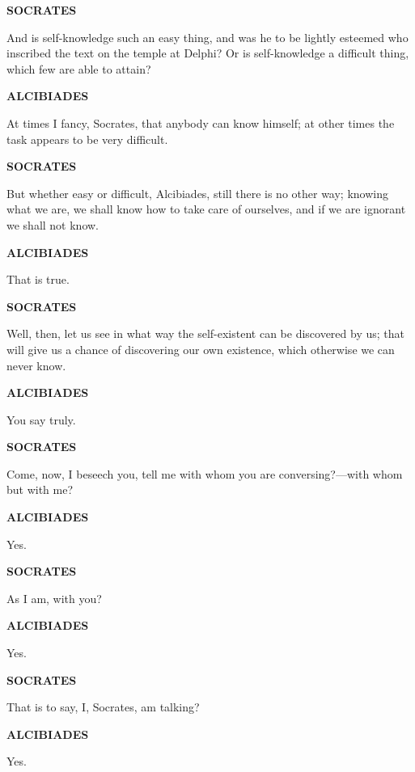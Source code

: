 \documentclass[11pt,letter]{article}
\begin{document}
\par \textbf{SOCRATES}
\par   And is self-knowledge such an easy thing, and was he to be lightly esteemed who inscribed the text on the temple at Delphi? Or is self-knowledge a difficult thing, which few are able to attain?

\par \textbf{ALCIBIADES}
\par   At times I fancy, Socrates, that anybody can know himself; at other times the task appears to be very difficult.

\par \textbf{SOCRATES}
\par   But whether easy or difficult, Alcibiades, still there is no other way; knowing what we are, we shall know how to take care of ourselves, and if we are ignorant we shall not know.

\par \textbf{ALCIBIADES}
\par   That is true.

\par \textbf{SOCRATES}
\par   Well, then, let us see in what way the self-existent can be discovered by us; that will give us a chance of discovering our own existence, which otherwise we can never know.

\par \textbf{ALCIBIADES}
\par   You say truly.

\par \textbf{SOCRATES}
\par   Come, now, I beseech you, tell me with whom you are conversing?—with whom but with me?

\par \textbf{ALCIBIADES}
\par   Yes.

\par \textbf{SOCRATES}
\par   As I am, with you?

\par \textbf{ALCIBIADES}
\par   Yes.

\par \textbf{SOCRATES}
\par   That is to say, I, Socrates, am talking?

\par \textbf{ALCIBIADES}
\par   Yes.
\end{document}
